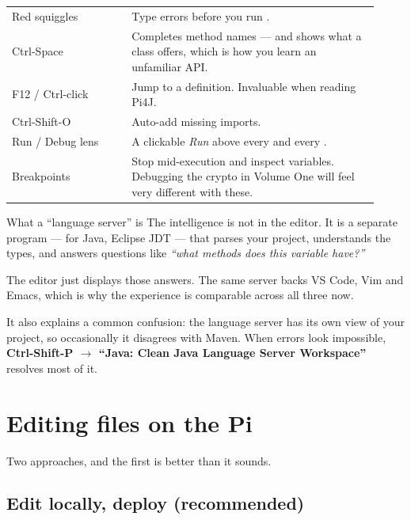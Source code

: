 \begin{center}\small
\begin{tabular}{@{}L{0.30\linewidth}L{0.62\linewidth}@{}}
\toprule
{} &  \\
\midrule
Red squiggles      & Type errors before you run . \\
Ctrl-Space         & Completes method names --- and shows what a class offers, which is how you learn an unfamiliar API. \\
F12 / Ctrl-click   & Jump to a definition. Invaluable when reading Pi4J. \\
Ctrl-Shift-O       & Auto-add missing imports. \\
Run / Debug lens   & A clickable \emph{Run} above every  and every . \\
Breakpoints        & Stop mid-execution and inspect variables. Debugging the crypto in Volume One will feel very different with these. \\
\bottomrule
\end{tabular}
\end{center}

\begin{concept}{What a ``language server'' is}
The intelligence is not in the editor. It is a separate program --- for Java,
Eclipse JDT --- that parses your project, understands the types, and answers
questions like \emph{``what methods does this variable have?''}

The editor just displays those answers. The same server backs VS Code, Vim and
Emacs, which is why the experience is comparable across all three now.

It also explains a common confusion: the language server has its own view of your
project, so occasionally it disagrees with Maven. When errors look impossible,
\textbf{Ctrl-Shift-P $\rightarrow$ ``Java: Clean Java Language Server
Workspace''} resolves most of it.
\end{concept}

\section{Editing files on the Pi}

Two approaches, and the first is better than it sounds.

\subsection{Edit locally, deploy (recommended)}

